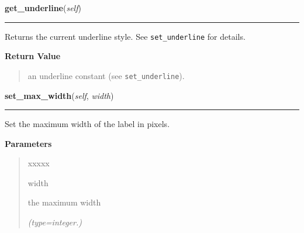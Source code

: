     \vspace{0.5ex}

\hspace{.8\funcindent}\begin{boxedminipage}{\funcwidth}

    \raggedright \textbf{get\_underline}(\textit{self})

    \vspace{-1.5ex}

    \rule{\textwidth}{0.5\fboxrule}
\setlength{\parskip}{2ex}
    Returns the current underline style. See \texttt{set\_underline} for 
    details.

\setlength{\parskip}{1ex}
      \textbf{Return Value}
    \vspace{-1ex}

      \begin{quote}
      an underline constant (see \texttt{set\_underline}).

      \end{quote}

    \end{boxedminipage}

    \label{pygtk_chart:label:Label:set_max_width}

    \vspace{0.5ex}

\hspace{.8\funcindent}\begin{boxedminipage}{\funcwidth}

    \raggedright \textbf{set\_max\_width}(\textit{self}, \textit{width})

    \vspace{-1.5ex}

    \rule{\textwidth}{0.5\fboxrule}
\setlength{\parskip}{2ex}
    Set the maximum width of the label in pixels.

\setlength{\parskip}{1ex}
      \textbf{Parameters}
      \vspace{-1ex}

      \begin{quote}
        \begin{Ventry}{xxxxx}

          \item[width]

          the maximum width

            {\it (type=integer.)}

        \end{Ventry}

      \end{quote}

    \end{boxedminipage}

